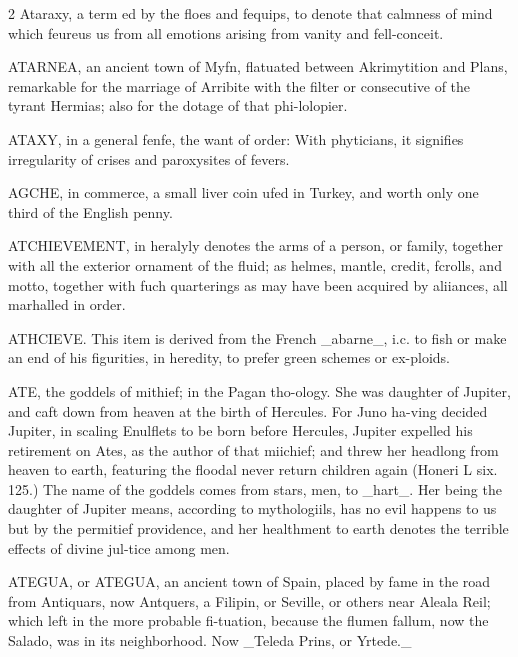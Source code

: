 \documentclass[10pt]{article}
\begin{document}
\begin{multicols}{2}\raggedcolumns
Ataraxy, a term ed by the floes and fequips, to denote that calmness of mind which feureus us from all emotions arising from vanity and fell-conceit.

ATARNEA, an ancient town of Myfn, flatuated between Akrimytition and Plans, remarkable for the marriage of Arribite with the filter or consecutive of the tyrant Hermias; also for the dotage of that phi-lolopier.

ATAXY, in a general fenfe, the want of order: With phyticians, it signifies irregularity of crises and paroxysites of fevers.

AGCHE, in commerce, a small liver coin ufed in Turkey, and worth only one third of the English penny.

ATCHIEVEMENT, in heralyly denotes the arms of a person, or family, together with all the exterior ornament of the fluid; as helmes, mantle, credit, fcrolls, and motto, together with fuch quarterings as may have been acquired by aliiances, all marhalled in order.

ATHCIEVE. This item is derived from the French \_abarne\_, i.c. to fish or make an end of his figurities, in heredity, to prefer green schemes or ex-ploids.

ATE, the goddels of mithief; in the Pagan tho-ology. She was daughter of Jupiter, and caft down from heaven at the birth of Hercules. For Juno ha-ving decided Jupiter, in scaling Enulflets to be born before Hercules, Jupiter expelled his retirement on Ates, as the author of that miichief; and threw her headlong from heaven to earth, featuring the floodal never return children again (Honeri L six. 125.) The name of the goddels comes from stars, men, to \_hart\_. Her being the daughter of Jupiter means, according to mythologiils, has no evil happens to us but by the permitief providence, and her healthment to earth denotes the terrible effects of divine jul-tice among men.

ATEGUA, or ATEGUA, an ancient town of Spain, placed by fame in the road from Antiquars, now Antquers, a Filipin, or Seville, or others near Aleala Reil; which left in the more probable fi-tuation, because the flumen fallum, now the Salado, was in its neighborhood. Now \_Teleda Prins, or Yrtede.\_


\end{multicols}
\end{document}

